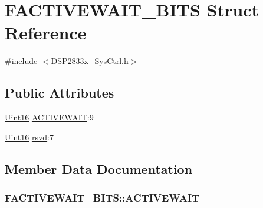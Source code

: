 \hypertarget{struct_f_a_c_t_i_v_e_w_a_i_t___b_i_t_s}{}\section{F\+A\+C\+T\+I\+V\+E\+W\+A\+I\+T\+\_\+\+B\+I\+T\+S Struct Reference}
\label{struct_f_a_c_t_i_v_e_w_a_i_t___b_i_t_s}


{\ttfamily \#include $<$D\+S\+P2833x\+\_\+\+Sys\+Ctrl.\+h$>$}

\subsection*{Public Attributes}
\begin{DoxyCompactItemize}
\item 
\hyperlink{_d_s_p2833x___device_8h_a59a9f6be4562c327cbfb4f7e8e18f08b}{Uint16} \hyperlink{struct_f_a_c_t_i_v_e_w_a_i_t___b_i_t_s_a5c15af4a405316e22931ab8d7bf4a0b8}{A\+C\+T\+I\+V\+E\+W\+A\+I\+T}\+:9
\item 
\hyperlink{_d_s_p2833x___device_8h_a59a9f6be4562c327cbfb4f7e8e18f08b}{Uint16} \hyperlink{struct_f_a_c_t_i_v_e_w_a_i_t___b_i_t_s_a32609d601ac20bd394aba79efa655b42}{rsvd}\+:7
\end{DoxyCompactItemize}


\subsection{Member Data Documentation}
\hypertarget{struct_f_a_c_t_i_v_e_w_a_i_t___b_i_t_s_a5c15af4a405316e22931ab8d7bf4a0b8}{}
\subsubsection[{A\+C\+T\+I\+V\+E\+W\+A\+I\+T}]{ F\+A\+C\+T\+I\+V\+E\+W\+A\+I\+T\+\_\+\+B\+I\+T\+S\+::\+A\+C\+T\+I\+V\+E\+W\+A\+I\+T}\label{struct_f_a_c_t_i_v_e_w_a_i_t___b_i_t_s_a5c15af4a405316e22931ab8d7bf4a0b8}
\hypertarget{struct_f_a_c_t_i_v_e_w_a_i_t___b_i_t_s_a32609d601ac20bd394aba79efa655b42}{}
